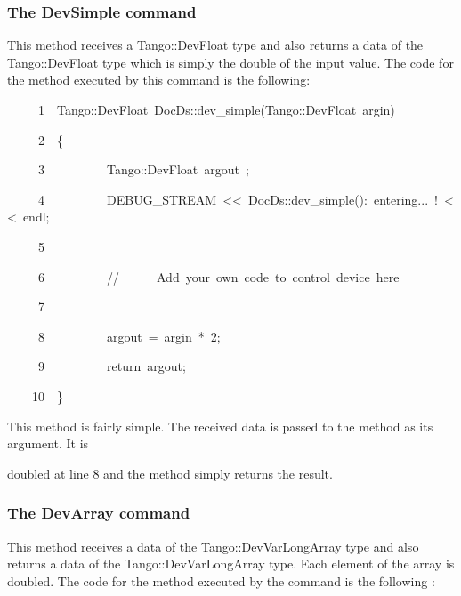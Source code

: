 \subsubsection{The DevSimple command}

This method receives a Tango::DevFloat type
and also returns a data of the Tango::DevFloat type which is simply
the double of the input value. The code for the method executed by
this command is the following:


\begin{lyxcode}
~~~~~1~~Tango::DevFloat~DocDs::dev\_simple(Tango::DevFloat~argin)

~~~~~2~~\{

~~~~~3~~~~~~~~~~Tango::DevFloat~argout~;

~~~~~4~~~~~~~~~~DEBUG\_STREAM~<\textcompwordmark{}<~\textquotedbl{}DocDs::dev\_simple():~entering...~!\textquotedbl{}~<\textcompwordmark{}<~endl;

~~~~~5~~

~~~~~6~~~~~~~~~~//~~~~~~Add~your~own~code~to~control~device~here

~~~~~7~~

~~~~~8~~~~~~~~~~argout~=~argin~{*}~2;

~~~~~9~~~~~~~~~~return~argout;

~~~~10~~\}
\end{lyxcode}


This method is fairly simple. The received data is passed to the method
as its argument. It is

doubled at line 8 and the method simply returns the result.

\subsubsection{The DevArray command}

This method receives a data of the Tango::DevVarLongArray
type and also returns a data of the Tango::DevVarLongArray type. Each
element of the array is doubled. The code for the method executed
by the command is the following :

